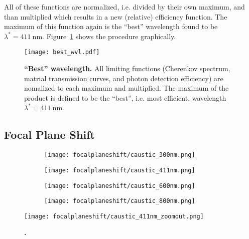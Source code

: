 All of these functions are normalized, i.e. divided by their own maximum, and than multiplied which results in a new (relative) efficiency function. The maximum of this function again is the \enquote{best} wavelength found to be $\lambda^\ast = \SI{411}{\nano\meter}$. Figure~\ref{best_wvl} shows the procedure graphically. 

\begin{figure}[H]
	\centering
	\texttt{[image: best\_wvl.pdf]}
	\caption[\enquote{Best} wavelength]{\textbf{\enquote{Best} wavelength.} All limiting functions (Cherenkov spectrum, matrial transmission curves, and photon detection efficiency) are nomalized to each maximum and multiplied. The maximum of the product is defined to be the \enquote{best}, i.e. most efficient, wavelength $\lambda^\ast=\SI{411}{\nano\meter}$.}
	\label{best_wvl}
\end{figure}

\subsection{Focal Plane Shift}

\begin{figure}[H]
	\centering
	\begin{subfigure}[t]{0.49\textwidth}
		\centering
		\texttt{[image: focalplaneshift/caustic\_300nm.png]}
		\subcaption{}
	\end{subfigure}
	\hfill
	\begin{subfigure}[t]{0.49\textwidth}
		\centering
		\texttt{[image: focalplaneshift/caustic\_411nm.png]}
		\subcaption{}
		\label{focalplaneshift_bestwvl}
	\end{subfigure}
	\hfill
	\begin{subfigure}[t]{0.49\textwidth}
		\centering
		\texttt{[image: focalplaneshift/caustic\_600nm.png]}
		\subcaption{}
	\end{subfigure}
	\hfill
	\begin{subfigure}[t]{0.49\textwidth}
		\centering
		\texttt{[image: focalplaneshift/caustic\_800nm.png]}
		\subcaption{}
	\end{subfigure}
	\caption[]{}
	\label{focalplaneshift}
\end{figure}

\begin{figure}[H]
	\centering
	\texttt{[image: focalplaneshift/caustic\_411nm\_zoomout.png]}
	\caption[]{\textbf{.} }
	\label{focalplaneshift_zoomout}
\end{figure}

